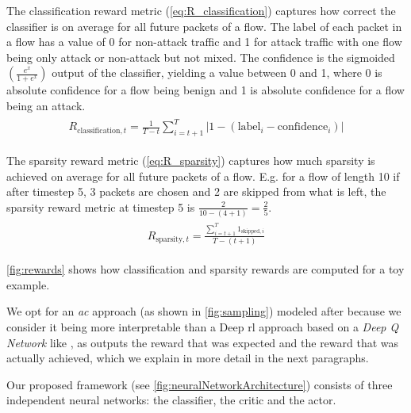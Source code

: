 \documentclass[conference]{IEEEtran}
\newcommand\note[2]{{\color{#1}#2}}
\begin{document}
The classification reward metric (\autoref{eq:R_classification}) captures how correct the classifier is on average for all future packets of a flow. The label of each packet in a flow has a value of 0 for non-attack traffic and 1 for attack traffic with one flow being only attack or non-attack but not mixed. The confidence is the sigmoided $\left(\frac{e^x}{1+e^x}\right)$ output of the classifier, yielding a value between 0 and 1, where 0 is absolute confidence for a flow being benign and 1 is absolute confidence for a flow being an attack.
\begin{align}
\begin{split}
R_{\text{classification},t} = \frac{1}{T-t} \sum_{i=t+1}^{T} |1 - \left(\text{label}_i - \text{confidence}_i\right)|
\end{split}
\label{eq:R_classification}
\end{align}

The sparsity reward metric (\autoref{eq:R_sparsity}) captures how much sparsity is achieved on average for all future packets of a flow. E.g. for a flow of length 10 if after timestep 5, 3 packets are chosen and 2 are skipped from what is left, the sparsity reward metric at timestep 5 is $\frac{2}{10-(4+1)}=\frac{2}{5}$.
\begin{align}
\begin{split}
R_{\text{sparsity},t} = \frac{\sum_{i=t+1}^{T} 1_{\text{skipped},i}}{T-(t+1)}
\end{split}
\label{eq:R_sparsity}
\end{align}

\autoref{fig:rewards} shows how classification and sparsity rewards are computed for a toy example.

We opt for an \emph{\gls{ac}} approach (as shown in \autoref{fig:sampling}) modeled after \cite{mnih_asynchronous_2016} because we consider it being more interpretable than a Deep \gls{rl} approach based on a \textit{Deep Q Network} like \cite{mnih_playing_2013}, as outputs the reward that was expected and the reward that was actually achieved, which we explain in more detail in the next paragraphs.

Our proposed framework (see \autoref{fig:neuralNetworkArchitecture}) consists of three independent neural networks: the classifier, the critic and the actor.
\end{document}
